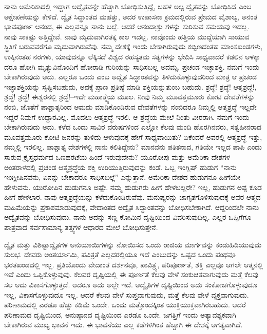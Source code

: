 ನಾನು ಅಮೆರಿಕಾದಲ್ಲಿ ಇದ್ದಾಗ ಅದ್ವೈತವನ್ನೇ ಹೆಚ್ಚಾಗಿ ಬೋಧಿಸುತ್ತಿದ್ದೆ, ಬಹಳ ಅಲ್ಪ ದ್ವೈತವನ್ನು ಬೋಧಿಸಿದೆ ಎಂಬ ಅಕ್ಷೇಪಣೆಯನ್ನು ಕೇಳಿದೆ. ದ್ವೈತ ಸಿದ್ಧಾಂತದ ಮಹತ್ತು, ಅದರ ಉಪಾಸನಾ ಕ್ರಮದಲ್ಲಿರುವ ಪ್ರೇಮದ ವೈಶಾಲ್ಯ, ಅನಂತ ಭಾವಪೂರ್ಣ ಆನಂದ, ಈ ಎಲ್ಲವನ್ನೂ ನಾನು ಬಲ್ಲೆ. ಆದರೆ ಆನಂದಾಶ್ರು ಗಳನ್ನು ಸುರಿಸುವ ಸಮಯವು ಇದಲ್ಲ. ನಾವು ಸಾಕಷ್ಟು ಅತ್ತಿದ್ದೇವೆ. ನಾವು ಮೃದುವಾಗಿರತಕ್ಕ ಕಾಲ ಇದಲ್ಲ. ನಾವೊಂದು ಹತ್ತಿಯ ಮುದ್ದೆಯಾಗಿ ಸಾಯುವ ಸ್ಥಿತಿಗೆ ಬರುವವರೆಗೂ ಮೃದುವಾಗಿರುವೆವು. ನಮ್ಮ ದೇಶಕ್ಕೆ ಇಂದು ಬೇಕಾಗಿರುವುದು ಕಬ್ಬಿಣದಂತಹ ಮಾಂಸಖಂಡಗಳು, ಉಕ್ಕಿನಂತಹ ನರಗಳು, ಯಾವುದನ್ನೂ ಲೆಕ್ಕಿಸದೆ ವಿಶ್ವದ ರಹಸ್ಯತಮ ಸತ್ಯಗಳನ್ನು ಭೇದಿಸಿ ಸಾಧ್ಯವಾದರೆ ಕಡಲಿನ ಆಳಕ್ಕಾ ದರೂ ಹೋಗಿ ಮೃತ್ಯುವಿನೊಂದಿಗೆ ಹೋರಾಡಿ ಗುರಿಯನ್ನು ಸಾಧಿಸಬಲ್ಲ ಅದಮ್ಯ, ಪ್ರಚಂಡ ಇಚ್ಛಾಶಕ್ತಿ. ನಮಗೆ ಇಂದು ಬೇಕಾಗಿರುವುದು ಅದು. ಎಲ್ಲರೂ ಒಂದು ಎಂಬ ಅದ್ವೈತ ಸಿದ್ಧಾಂತವನ್ನು ತಿಳಿದುಕೊಳ್ಳುವುದರಿಂದ ಮಾತ್ರ ಆ ಪ್ರಚಂಡ ಇಚ್ಛಾಶಕ್ತಿಯನ್ನು ಸೃಷ್ಟಿಸಬಹುದು, ಅದಕ್ಕೆ ಪ್ರಾಣ ಪ್ರತಿಷ್ಠೆ ಮಾಡಿ ಶಕ್ತಿಯನ್ನುತುಂಬ ಬಹುದು. ಶ್ರದ್ಧೆ! ಶ್ರದ್ಧೆ! ಆತ್ಮಶ್ರದ್ಧೆ!, ಶ್ರದ್ಧೆ! ಶ್ರದ್ಧೆ! ಈಶ್ವರನಲ್ಲಿ ಶ್ರದ್ಧೆ!–ಇದೇ ಮಹಾತ್ಮ್ಯೆಯ ಮೂಲ. ನೀವು ನಿಮ್ಮ ಮೂವತ್ತಮೂರು ಕೋಟಿ ದೇವತೆ\-ಗಳನ್ನು ನಂಬಿ, ಜೊತೆಗೆ ಪಾಶ್ಚಾತ್ಯರಿಂದ ಆಮದು ಮಾಡಿಕೊಂಡಿರುವ ದೇವತೆಗಳನ್ನು ನಂಬಿದರೂ ನಿಮ್ಮಲ್ಲಿ ಆತ್ಮಶ್ರದ್ಧೆ ಇಲ್ಲದೇ ಇದ್ದರೆ ನಿಮಗೆ ಉದ್ಧಾರವಿಲ್ಲ. ಮೊದಲು ಆತ್ಮಶ್ರದ್ಧೆ ಇರಲಿ. ಆ ಶ್ರದ್ಧೆಯ ಮೇಲೆ ನಿಂತು ವೀರರಾಗಿ. ನಮಗೆ ಇಂದು ಬೇಕಾಗಿರುವುದು ಅದು. ಕಳೆದ ಒಂದು ಸಾವಿರ ವರುಷಗಳಿಂದ ಎಲ್ಲೋ ಕೆಲವು ಮಂದಿ ಹೊರಗಿನವರು, ಸತ್ವಹೀನರಾದ ಮೂವತ್ತಮೂರು ಕೋಟಿ ಜನರನ್ನು ತುಳಿದು ಆಳುವುದಕ್ಕೆ ಹೇಗೆ ಸಾಧ್ಯವಾಯಿತು? ಏಕೆಂದರೆ ಅವರಲ್ಲಿ ಆತ್ಮಶ್ರದ್ಧೆ ಇತ್ತು, ನಮ್ಮಲ್ಲಿ ಇರಲಿಲ್ಲ. ಪಾಶ್ಚಾತ್ಯ ದೇಶಗಳಲ್ಲಿ ನಾನು ಕಲಿತಿದ್ದೇನು? ಮಾನವನು ಪತಿತನಾದ, ಗತಿಯೇ ಇಲ್ಲದ ಪಾಪಿ ಎಂದು ಸಾರುವ ಕ್ರೈಸ್ತಧರ್ಮದ ಒಣಹರಟೆಯ ಹಿಂದೆ ಇರುವುದೇನು? ಯೂರೋಪು ಮತ್ತು ಅಮೆರಿಕಾ ದೇಶಗಳ ಅಂತರಾಳದಲ್ಲಿ ಪ್ರಚಂಡ ಆತ್ಮಶ್ರದ್ಧೆಯ ಶಕ್ತಿ ಉರಿಯುತ್ತಿರುವುದನ್ನು ಕಂಡೆ. ಒಬ್ಬ ಇಂಗ್ಲಿಷ್​ ಹುಡುಗ “ನಾನು ಇಂಗ್ಲೀಷಿನವನು, ಏನನ್ನು ಬೇಕಾದರೂ ಸಾಧಿಸಬಲ್ಲೆ” ಎನ್ನುತ್ತಾನೆ. ಅಮೆರಿಕಾ ದೇಶದ ಹುಡುಗನೂ ಹೀಗೆಯೇ ಹೇಳುವನು. ಯುರೋಪಿನ ಹುಡುಗನೂ ಅಷ್ಟೇ. ನಮ್ಮ ಹುಡುಗರು ಹೀಗೆ ಹೇಳಬಲ್ಲರೇ? ಇಲ್ಲ, ಹುಡುಗನ ಅಪ್ಪ ಕೂಡ ಹೀಗೆ ಹೇಳಲಾರ. ನಾವು ಆತ್ಮಶ್ರದ್ಧೆಯನ್ನು ಕಳೆದುಕೊಂಡಿರುವೆವು. ಮನುಷ್ಯರನ್ನು ಜಾಗೃತಗೊಳಿಸುವುದಕ್ಕೆ ಅವರ ಆತ್ಮದ ಮಹಿಮೆಯನ್ನು ಪ್ರಕಾಶಮಾಡುವುದಕ್ಕೆ, ವೇದಾಂತದ ಅದ್ವೈತ ಸಿದ್ಧಾಂತವನ್ನು ಬೋಧಿಸಬೇಕಾಗಿದೆ. ಆದ್ದರಿಂದಲೇ ನಾನು ಅದ್ವೈತವನ್ನು ಬೋಧಿಸುವುದು. ನಾನು ಅದನ್ನು ಸಣ್ಣ ಕೋಮಿನ ದೃಷ್ಟಿಯಿಂದ ವಿವರಿಸುವುದಿಲ್ಲ. ಎಲ್ಲರ ಒಪ್ಪಿಗೆಗೂ ಪಾತ್ರವಾದ ಸರ್ವಸಾಮಾನ್ಯ ತತ್ತ್ವಗಳ ಆಧಾರದ ಮೇಲೆ ಬೋಧಿಸುತ್ತೇನೆ. 

ದ್ವೈತ ಮತ್ತು ವಿಶಿಷ್ಟಾದ್ವೈತಗಳ ಅನುಯಾಯಿಗಳನ್ನು ನೋಯಿಸದ ಒಂದು ರಾಜಿಯ ಮಾರ್ಗವನ್ನು ಕಂಡುಹಿಡಿಯುವುದು ಸುಲಭ. ದೇವರು ಅಂತರ್ಯಾಮಿ, ಪವಿತ್ರತೆ ಎಲ್ಲದರಲ್ಲಿಯೂ ಇದೆ ಎಂಬುದನ್ನು ಒಪ್ಪದ ಒಂದು ಪಂಥವೂ ಭರತಖಂಡದಲ್ಲಿ ಇಲ್ಲ. ಪ್ರತಿಯೊಂದು ವೇದಾಂತ ದರ್ಶನವೂ, ಪಾವಿತ್ರ್ಯ, ಪರಿಪೂರ್ಣತೆ, ಶಕ್ತಿ ಎಲ್ಲವೂ ಆಗಲೇ ಆತ್ಮನಲ್ಲಿ ಇವೆ ಎಂದು ಒಪ್ಪಿಕೊಳ್ಳುವುವು. ಕೆಲವರ ದೃಷ್ಟಿಯಲ್ಲಿ ಈ ಪೂರ್ಣತೆ ಕೆಲವು ವೇಳೆ ಸಂಕುಚಿತವಾಗುವುದು ಮತ್ತೆ ಕೆಲವು ಸಲ ಅದು ವಿಕಾಸಗೊಳ್ಳುತ್ತದೆ. ಆದರೂ ಅದು ಅಲ್ಲೇ ಇದೆ. ಅದ್ವೈತಿಗಳ ದೃಷ್ಟಿಯಿಂದ ಅದು ಸಂಕೋಚಗೊಳ್ಳುವುದೂ ಇಲ್ಲ, ವಿಕಾಸಗೊಳ್ಳುವುದೂ ಇಲ್ಲ. ಆದರೆ ಕೆಲವು ವೇಳೆ ಸುಪ್ತವಾಗುವುದು, ಮತ್ತೆ ಕೆಲವು ವೇಳೆ ವ್ಯಕ್ತವಾಗುವುದು. ಪರಿಣಾಮದಲ್ಲಿ ಎರಡೂ ಹೆಚ್ಚು ಕಡಿಮೆ ಒಂದೇ. ಒಂದು ಮತ್ತೊಂದಕ್ಕಿಂತ ಯುಕ್ತಿಯುಕ್ತವಾಗಿರಬಹುದು. ಆದರೆ ಪರಿಣಾಮದ ದೃಷ್ಟಿಯಿಂದ, ಅನುಷ್ಠಾನದ ದೃಷ್ಟಿಯಿಂದ ಎರಡೂ ಒಂದೇ. ಜಗತ್ತಿಗೆ ಇಂದು ಅತ್ಯಾವಶ್ಯಕವಾಗಿ ಬೇಕಾಗಿರುವ ಮುಖ್ಯ ಭಾವನೆ ಇದು. ಈ ಭಾವನೆಯು ಎಲ್ಲ ಕಡೆಗಳಿಗಿಂತ ಹೆಚ್ಚಾಗಿ ಈ ದೇಶಕ್ಕೆ ಅಗತ್ಯವಾಗಿದೆ. 

